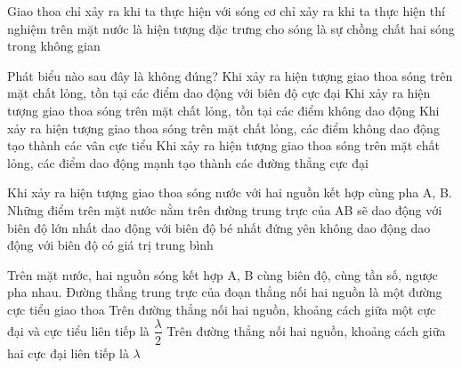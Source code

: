 \begin{ex}%
Giao thoa
\choice
{chỉ xảy ra khi ta thực hiện với sóng cơ}
{chỉ xảy ra khi ta thực hiện thí nghiệm trên mặt nước}
{\True là hiện tượng đặc trưng cho sóng}
{là sự chồng chất hai sóng trong không gian}
\end{ex} 
\begin{ex}
Phát biểu nào sau đây là không đúng?
\choice
{Khi xảy ra hiện tượng giao thoa sóng trên mặt chất lỏng, tồn tại các điểm dao động với biên độ cực đại}
{Khi xảy ra hiện tượng giao thoa sóng trên mặt chất lỏng, tồn tại các điểm không dao động}
{Khi xảy ra hiện tượng giao thoa sóng trên mặt chất lỏng, các điểm không dao động tạo thành các vân cực tiểu}
{\True Khi xảy ra hiện tượng giao thoa sóng trên mặt chất lỏng, các điểm dao động mạnh tạo thành các đường thẳng cực đại}
\loigiai{}
\end{ex}
\begin{ex}
Khi xảy ra hiện tượng giao thoa sóng nước với hai nguồn kết hợp cùng pha A, B. Những điểm trên mặt nước nằm trên đường trung trực của AB sẽ
\choice
{\True dao động với biên độ lớn nhất}
{dao động với biên độ bé nhất}
{đứng yên không dao động}
{dao động với biên độ có giá trị trung bình}
\loigiai{}
\end{ex}

\PhanII
\setcounter{ex}{0}
\begin{ex}
Trên mặt nước, hai nguồn sóng kết hợp A, B cùng biên độ, cùng tần số, ngược pha nhau.
{\True Đường thẳng trung trực của đoạn thẳng nối hai nguồn là một đường cực tiểu giao thoa}
{Trên đường thẳng nối hai nguồn, khoảng cách giữa một cực đại và cực tiểu liên tiếp là $\dfrac{\lambda}{2}$}
{Trên đường thẳng nối hai nguồn, khoảng cách giữa hai cực đại liên tiếp là $\lambda$}
\loigiai{
\begin{itemchoice}
\itemch
\itemch
\itemch
\itemch
\end{itemchoice}
}
\end{ex} 

